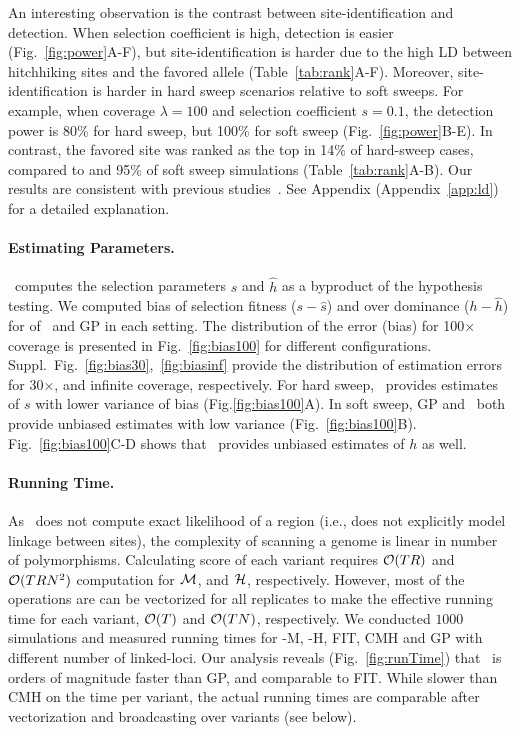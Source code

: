 An interesting observation is the contrast between site-identification
and detection. When selection coefficient is high, detection is easier
(Fig.~\ref{fig:power}A-F), but site-identification is harder due to
the high LD between hitchhiking sites and the favored allele
(Table~\ref{tab:rank}A-F).  Moreover, site-identification is harder in
hard sweep scenarios relative to soft sweeps. For example, when
coverage $\lambda=100$ and selection coefficient $s=0.1$, the
detection power is 80\% for hard sweep, but 100\% for soft sweep
(Fig.~\ref{fig:power}B-E). In contrast, the favored site was ranked as
the top in 14\% of hard-sweep cases, compared to and 95\% of soft
sweep simulations (Table~\ref{tab:rank}A-B).  Our results are
consistent with previous
studies~\cite{long2013massive,tobler2014massive}. See Appendix
(Appendix~\ref{app:ld}) for a detailed explanation.
 
\paragraph{Estimating Parameters.}
\comale\ computes the selection parameters $\hat{s}$ and $\hat{h}$ as
a byproduct of the hypothesis testing. We computed bias of selection
fitness ($s-\hat{s}$) and over dominance ($h-\hat{h}$) for of \comale\
and GP in each setting. The distribution of the error (bias) for
100$\times$ coverage is presented in Fig.~\ref{fig:bias100} for
different configurations.
Suppl.~Fig.~\ref{fig:bias30},~\ref{fig:biasinf} provide the
distribution of estimation errors for 30$\times$, and infinite
coverage, respectively.  For hard sweep, \comale\ provides estimates
of $s$ with lower variance of bias (Fig.\ref{fig:bias100}A). In soft
sweep, GP and \comale\ both provide unbiased estimates with low
variance (Fig.~\ref{fig:bias100}B). Fig.~\ref{fig:bias100}C-D shows
that \comale\ provides unbiased estimates of $h$ as well.

\paragraph{Running Time.}
As \comale\ does not compute exact likelihood of a region (i.e., does
not explicitly model linkage between sites), the complexity of
scanning a genome is linear in number of polymorphisms.  Calculating
score of each variant requires ${\cal O}(TR)$ and ${\cal O}(TRN^2)$ computation
for ${\cal M}$, and ${\cal H}$, respectively. However, most of the operations
are can be vectorized for all replicates to make the effective running
time for each variant, ${\cal O}(T)$ and ${\cal O}(TN)$, respectively.  We
conducted $1000$ simulations and measured running times for \comale-M,
\comale-H, FIT, CMH and GP with different number of linked-loci.  Our
analysis reveals (Fig.~\ref{fig:runTime}) that \comale\ is orders of
magnitude faster than GP, and comparable to FIT. While slower than CMH
on the time per variant, the actual running times are comparable after
vectorization and broadcasting over variants (see below).

